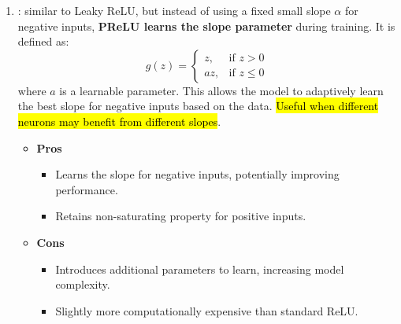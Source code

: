 \begin{enumerate}
    \item {}: similar to Leaky ReLU, but instead of using a fixed small slope $\alpha$ for negative inputs, \textbf{PReLU learns the slope parameter} during training. It is defined as:
    \begin{equation}
        g\left(z\right) = \begin{cases}
            z, & \text{if } z > 0 \\
            a z, & \text{if } z \leq 0
        \end{cases}
    \end{equation}
    where $a$ is a learnable parameter. This allows the model to adaptively learn the best slope for negative inputs based on the data. \hl{Useful when different neurons may benefit from different slopes}.
    \begin{itemize}
        \item[\textcolor{Green3}{\faIcon{check-circle}}] \textcolor{Green3}{\textbf{Pros}}
        \begin{itemize}
            \item[\textcolor{Green3}{\faIcon{check}}] Learns the slope for negative inputs, potentially improving performance.
            \item[\textcolor{Green3}{\faIcon{check}}] Retains non-saturating property for positive inputs.
        \end{itemize}
        \item[\textcolor{Red2}{\faIcon{times-circle}}] \textcolor{Red2}{\textbf{Cons}}
        \begin{itemize}
            \item[\textcolor{Red2}{\faIcon{times}}] Introduces additional parameters to learn, increasing model complexity.
            \item[\textcolor{Red2}{\faIcon{times}}] Slightly more computationally expensive than standard ReLU.
        \end{itemize}
    \end{itemize}
    


\end{enumerate}
